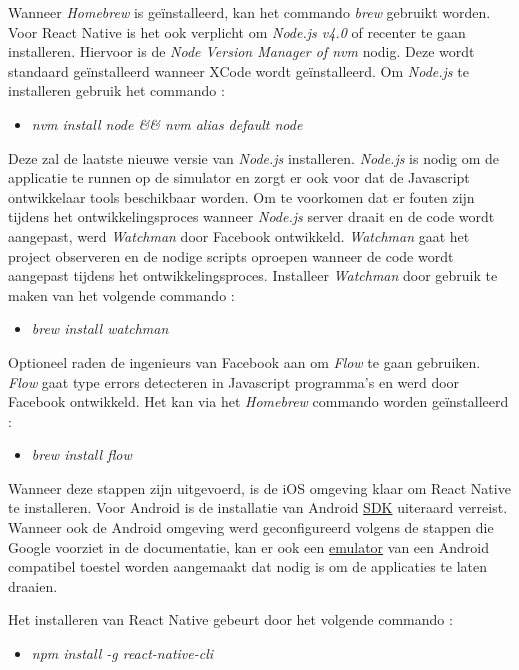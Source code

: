Wanneer \emph{Homebrew} is geïnstalleerd, kan het commando \emph{brew} gebruikt worden. Voor React Native is het ook verplicht om \emph{Node.js v4.0} of recenter te gaan installeren. Hiervoor is de \emph{Node Version Manager of nvm} nodig. Deze wordt standaard geïnstalleerd wanneer XCode wordt geïnstalleerd. Om \emph{Node.js} te installeren gebruik het commando : 
\begin{itemize}
\item [] \emph{nvm install node \&\& nvm alias default node}
\end{itemize}
Deze zal de laatste nieuwe versie van \emph{Node.js} installeren. \emph{Node.js} is nodig om de applicatie te runnen op de simulator en zorgt er ook voor dat de Javascript ontwikkelaar tools beschikbaar worden. 
Om te voorkomen dat er fouten zijn tijdens het ontwikkelingsproces wanneer \emph{Node.js} server draait en de code wordt aangepast, werd \emph{Watchman} door Facebook ontwikkeld. \emph{Watchman} gaat het project observeren en de nodige scripts oproepen wanneer de code wordt aangepast tijdens het ontwikkelingsproces. Installeer \emph{Watchman} door gebruik te maken van het volgende commando : 
\begin{itemize}
	\item [] \emph{brew install watchman}
\end{itemize}  
Optioneel raden de ingenieurs van Facebook aan om \emph{Flow} te gaan gebruiken. \emph{Flow} gaat type errors detecteren in Javascript programma's en werd door Facebook ontwikkeld. Het kan via het \emph{Homebrew} commando worden geïnstalleerd : 
\begin{itemize}
	\item [] \emph{brew install flow}
\end{itemize}
Wanneer deze stappen zijn uitgevoerd, is de iOS omgeving klaar om React Native te installeren. Voor Android is de installatie van Android \hyperref[sdk]{SDK} uiteraard verreist. Wanneer ook de Android omgeving werd geconfigureerd volgens de stappen die Google voorziet in de documentatie, kan er ook een \hyperref[emulator]{emulator} van een Android compatibel toestel worden aangemaakt dat nodig is om de applicaties te laten draaien.

Het installeren van React Native gebeurt door het volgende commando : 
\begin{itemize}
	\item [] \emph{npm install -g react-native-cli}
\end{itemize}

